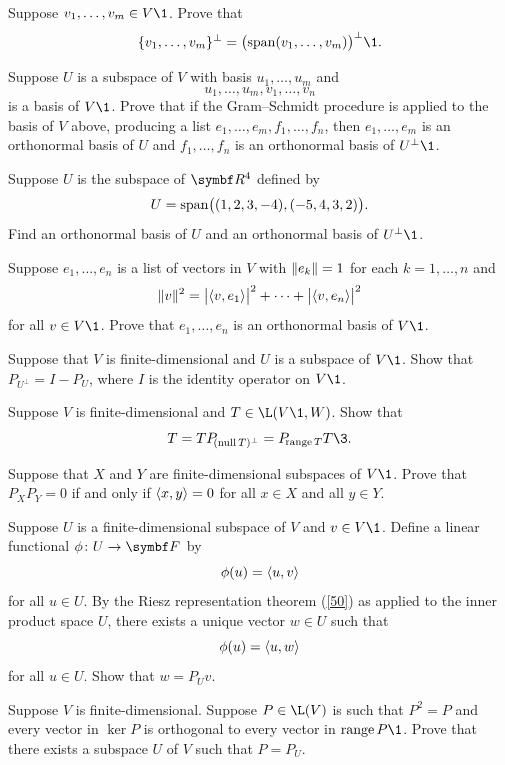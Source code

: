 \begin{exercises}

\exercise
Suppose $v_1, \dots, v_m \in V\1$. Prove that
\[
\{v_1, \dots, v_m\}^\perp = \bigl( \Span(v_1, \dots, v_m) \bigr)^\perp\1.
\]
\exercisedisplayend


\exercise
Suppose $U$ is a subspace of $V$ with basis $u_1, \dots, u_m$ and\label{6onbasis}
\[
u_1, \dots, u_m, v_1, \dots, v_n
\]
is a basis of $V\1$. Prove that if the Gram--Schmidt procedure is applied to the basis of $V$ above, producing a list $e_1, \dots, e_m, f_1, \dots, f_n$, then $e_1, \dots, e_m$ is an orthonormal basis of $U$ and $f_1, \dots, f_n$ is an orthonormal basis of $U^\perp\1$.


\exercise
Suppose $U$ is the subspace of $\R4$ defined by
\[
U = \Span\bigl( (1,2,3,-4), (-5,4, 3, 2) \bigr).
\]
Find an orthonormal basis of $U$ and an orthonormal basis of $U^\perp\1$.


\exercise
Suppose $e_1, \ldots, e_n$ is a list of vectors in $V$ with $\norm{e_k} = 1$ for each $k=1, \ldots, n$ and \label{190converse}
\[
\|v\|^2 = \abs[\big]{ \ip{v, e_1} }^2  + \dots + \abs[\big]{ \ip{v, e_n} }^2
\]
for all $v \in V\1$. Prove that $e_1, \ldots, e_n$ is an orthonormal basis of $V\1$.


\exercise
Suppose that $V$ is finite-dimensional and $U$ is a subspace of $V\1$. Show that
$P_{\!U^\perp} = I - P_{\!U}$, where $I$ is the identity operator on $V\1$.


\exercise
Suppose $V$ is finite-dimensional and $T \in \L(V\1, W)$. Show that
\[
T = TP_{\!(\ker T)^\perp}= P_{\!\ran T} T\3.
\]
\exercisedisplayend


\exercise
Suppose that $X$ and $Y$ are finite-dimensional subspaces of $V\1$. Prove that $P_{\!X} P_{\!Y} = 0$ if and only if $\ip{x, y} = 0$ for all $x \in X$ and all $y \in Y$.


\exercise
Suppose $U$ is a finite-dimensional subspace of $V$ and $v \in V\1$. Define a linear functional $\fun \phi U \F{}$ by
\[
\phi(u) = \ip{u, v}
\]
for all $u \in U$. By the Riesz representation theorem (\ref{50}) as applied to the inner product space $U$, there exists a unique vector
$w \in U$ such that
\[
\phi(u) = \ip{u, w}
\]
for all $u \in U$. Show that $w = P_{\!U} v$.


\exercise
Suppose $V$ is finite-dimensional. Suppose $P \in \L(V)$ is such that $P^2 = P$ and every vector in
$\ker P$ is orthogonal to every vector in $\ran P\1$. Prove that there exists a subspace $U$ of $V$ such that $P = P_{\!U}$.\label{6orth}



\end{exercises}
